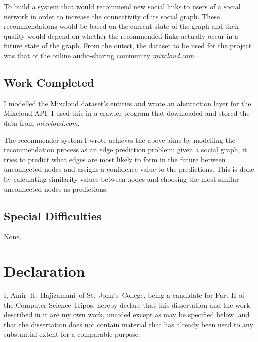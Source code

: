 \documentclass[a4paper,12pt,twoside,notitlepage]{report}
\def\authorname{Amir~H.~Hajizamani}
\def\authorcollege{St.~John's~College}
\def\mixurl{\emph{mixcloud.com}}
\begin{document}
To build a system that would recommend new social links to users of a social
network in order to increase the connectivity of its social graph. These
recommendations would be based on the current state of the graph and their
quality would depend on whether the recommended links actually occur in a
future state of the graph. From the outset, the dataset to be used for the
project was that of the online audio-sharing community \mixurl.

\subsection*{Work Completed}
I modelled the Mixcloud dataset's entities and wrote an abstraction layer for
the Mixcloud API. I used this in a crawler program that downloaded and stored
the data from \mixurl.

The recommender system I wrote achieves the above aims by modelling the
recommendation process as an edge prediction problem: given a social graph,
it tries to predict what edges are most likely to form in the future between
unconnected nodes and assigns a confidence value to the predictions. This is
done by calculating similarity values between nodes and choosing the most
similar unconnected nodes as predictions.

\subsection*{Special Difficulties}

None.

\newpage

\section*{Declaration}

I, \authorname~of \authorcollege, being a candidate for Part II of the Computer
Science Tripos, hereby declare that this dissertation and the work described in
it are my own work, unaided except as may be specified below, and that
the dissertation does not contain material that has already been used to any
substantial extent for a comparable purpose.

\bigskip
\bigskip
\bigskip
{}

\medskip
{}


\clearpage
\end{document}
